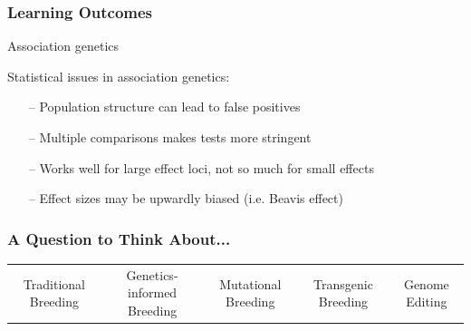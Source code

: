 \documentclass[xcolor=dvipsnames]{beamer}
\begin{document}
\begin{frame}
	
	\frametitle{Learning Outcomes}
	
	Association genetics
	
	Statistical issues in association genetics:
	\begin{itemize}
		\item[--]   Population structure can lead to false positives
		\item[--]	Multiple comparisons makes tests more stringent
		\item[--]   Works well for large effect loci, not so much for small effects
		\item[--]	Effect sizes may be upwardly biased (i.e. Beavis effect)
	\end{itemize}

\end{frame}
\begin{frame}
	\frametitle{A Question to Think About...}
	
	
	
\end{frame}

\begin{frame}
\scriptsize
		\begin{tabular}{c|c|c|c|c}
			Traditional Breeding &Genetics-informed Breeding & Mutational Breeding & Transgenic Breeding & Genome Editing \\
				
			\end{tabular}
\end{frame}
\end{document}
